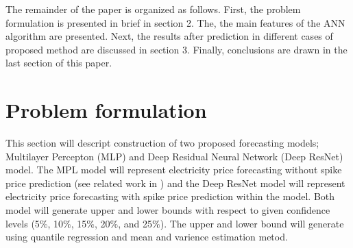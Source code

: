 \documentclass[review]{elsarticle}
\begin{document}

    The remainder of the paper is organized as follows.
    First, the problem formulation is presented in brief in section 2.
    The, the main features of the ANN algorithm are presented.
    Next, the results after prediction in different cases of proposed method  are discussed in section 3.
    Finally, conclusions are drawn in the last section of this paper.

  \section{Problem formulation}
    This section will descript construction of two proposed forecasting models; Multilayer Percepton (MLP) and Deep Residual Neural Network (Deep ResNet) model.
    The MPL model will represent electricity price forecasting without spike price prediction (see related work in \cite{Dudek2016}) and the Deep ResNet model will represent electricity price forecasting with spike price prediction within the model.
    Both model will generate upper and lower bounds with respect to given confidence levels (5$\%$, 10$\%$, 15$\%$, 20$\%$, and 25$\%$).
    The upper and lower bound will generate using quantile regression and mean and varience estimation metod.
\end{document}
